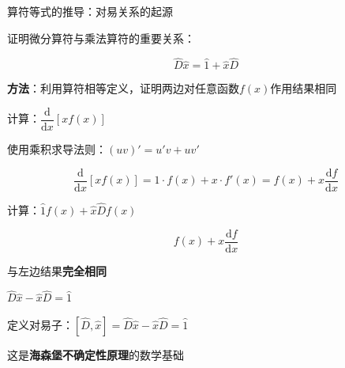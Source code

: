 \documentclass[aspectratio=169, 10pt]{beamer}
\begin{document}
\begin{frame}{算符等式的推导：对易关系的起源}
  
  \begin{iqbitemize}
    \item 证明微分算符与乘法算符的重要关系：
    \end{iqbitemize}
      \[
        \boxed{\hat{D}\hat{x} = \hat{1} + \hat{x}\hat{D}}
      \]
    \begin{iqbitemize}
    \item \textbf{方法}：利用算符相等定义，证明两边对任意函数$f(x)$作用结果相同
    \end{iqbitemize}
    \iqbtinysep

    \begin{iqbitemize}
    \item 计算：$\dfrac{\mathrm{d}}{\mathrm{d}x}[xf(x)]$
    \item 使用乘积求导法则：$(uv)' = u'v + uv'$
    \end{iqbitemize}
      \[
        \dfrac{\mathrm{d}}{\mathrm{d}x}[xf(x)] = 1 \cdot f(x) + x \cdot f'(x) = f(x) + x\dfrac{\mathrm{d}f}{\mathrm{d}x}
      \]
    \begin{iqbitemize}
    \item 计算：$\hat{1}f(x) + \hat{x}\hat{D}f(x)$
    \end{iqbitemize}
      \[
        f(x) + x\dfrac{\mathrm{d}f}{\mathrm{d}x}
      \]
    \begin{iqbitemize}
    \item 与左边结果\textbf{完全相同}
    \end{iqbitemize}
    \iqbsmallsep

    \begin{iqbitemize}
    \item $\hat{D}\hat{x} - \hat{x}\hat{D} = \hat{1}$
    \item 定义对易子：$[\hat{D}, \hat{x}] = \hat{D}\hat{x} - \hat{x}\hat{D} = \hat{1}$
    \item 这是\textbf{海森堡不确定性原理}的数学基础
    \end{iqbitemize}
    \iqbtinysep

\end{frame}
\end{document}
